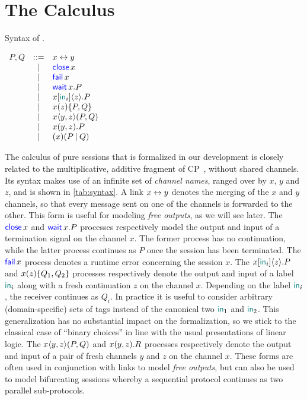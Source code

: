 \section{The Calculus}
\label{sec:calculus}

\begin{table}
    \caption{Syntax of \Calculus.}
    \label{tab:syntax}
    \begin{math}
        \displaystyle
        \begin{array}[t]{rcll}
            P, Q & ::= & \Link\x\y \\
                & | & \Close\x \\
                & | & \Fail\x \\
                & | & \Wait\x.P \\
                & | & \Select\x{\InTag_i}\z.P \\
                & | & \Case\x\z{P}{Q} \\
                & | & \Fork\x\y\z{P}{Q} \\
                & | & \Join\x\y\z.P \\
                & | & \Cut\x{P}{Q} \\
        \end{array}
    \end{math}
\end{table}

The calculus of pure sessions that is formalized in our development is closely
related to the multiplicative, additive fragment of CP~\citep{Wadler14}, without
shared channels. Its syntax makes use of an infinite set of \emph{channel
names}, ranged over by $x$, $y$ and $z$, and is shown in \cref{tab:syntax}.
%
A link $x\leftrightarrow y$ denotes the merging of the $x$ and $y$ channels, so that
every message sent on one of the channels is forwarded to the other. This form
is useful for modeling \emph{free outputs}, as we will see later.
%
The $\mathsf{\color{blue}close}\,x$ and $\mathsf{\color{blue}wait}\,x.P$ processes respectively model the output and input
of a termination signal on the channel $x$. The former process has no
continuation, while the latter process continues as $P$ once the session has
been terminated.
%
The $\mathsf{\color{blue}fail}\,x$ process denotes a runtime error concerning the session $x$.
%
The $\Select\x{\InTag_i}\z.P$ and $\Case\x\z{Q_1}{Q_2}$ processes respectively
denote the output and input of a label $\mathsf{\color{teal}in}_i$ along with a fresh
continuation $z$ on the channel $x$. Depending on the label $\mathsf{\color{teal}in}_i$, the
receiver continues as $Q_i$. In practice it is useful to consider arbitrary
(domain-specific) sets of tags instead of the canonical two $\mathsf{\color{teal}in}_1$ and
$\mathsf{\color{teal}in}_2$. This generalization has no substantial impact on the formalization,
so we stick to the classical case of ``binary choices'' in line with the usual
presentations of linear logic.
%
The $\Fork\x\y\z{P}{Q}$ and $\Join\x\y\z.R$ processes respectively denote the
output and input of a pair of fresh channels $y$ and $z$ on the channel $x$.
These forms are often used in conjunction with links to model \emph{free
outputs}, but can also be used to model bifurcating sessions whereby a
sequential protocol continues as two parallel sub-protocols.

